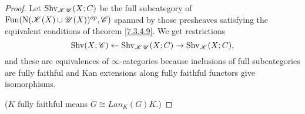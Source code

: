 \documentclass[../../thesis.tex]{subfiles}
\begin{document}
\begin{proof}
    Let $\mathrm{Shv}_{\mathscr{K}\mathscr{U}}(X;C)$ be the full subcategory of $\mathrm{Fun}(\mathrm{N}(\mathscr{K}(X)\cup \mathscr{U}(X))^{op},\mathscr{C})$ spanned by those presheaves satisfying the equivalent conditions of theorem \ref{7.3.4.9}. We get restrictions
    \[
        \mathrm{Shv}(X;\mathscr{C}) \leftarrow \mathrm{Shv}_{\mathscr{K}\mathscr{U}}(X;C) \to \mathrm{Shv}_{\mathscr{K}}(X;C),
    \]
    and these are equivalences of $\infty$-categories because inclusions of full subcategories are fully faithful and Kan extensions along fully faithful functors give isomorphisms.

    ($K$ fully faithful means $G \cong Lan_K(G)K$.)
\end{proof}
\end{document}
